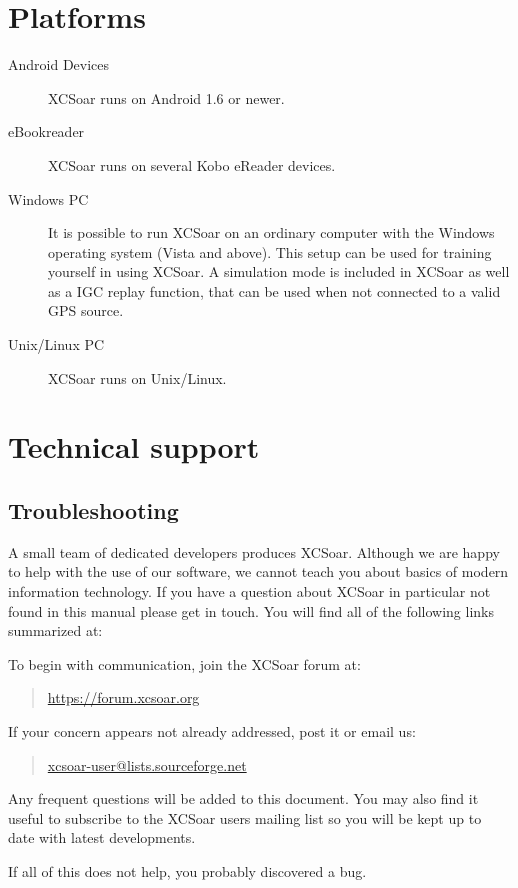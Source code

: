 \section{Platforms}
\begin{description}
\item[Android Devices]
XCSoar runs on Android 1.6 or newer.
\item [eBookreader]
XCSoar runs on several Kobo eReader devices.
\item[Windows PC]
It is possible to run XCSoar on an ordinary computer with the Windows
operating system (Vista and above). This setup can be used for training yourself in using XCSoar.
A simulation mode is included in XCSoar as well as a IGC replay function, that
can be used when not connected to a valid GPS source.
\item[Unix/Linux PC]
XCSoar runs on Unix/Linux.
\end{description}



\section{Technical support}

\subsection*{Troubleshooting}
A small team of dedicated developers produces XCSoar. Although we are
happy to help with the use of our software, we cannot teach you about
basics of modern information technology. If you have a question about XCSoar in
particular not found in this manual please get in touch. You will find all of the following links summarized at:
\begin{quote}
\end{quote}
To begin with communication, join the XCSoar forum at:
\begin{quote}
\url{https://forum.xcsoar.org}
\end{quote}
If your concern appears not already addressed, post it or email us: 
\begin{quote}
\href{mailto:xcsoar-user@lists.sourceforge.net}{xcsoar-user@lists.sourceforge.net}
\end{quote}
Any frequent questions will be added to this document.
You may also find it useful to subscribe to the XCSoar users mailing
list so you will be kept up to date with latest developments.

If all of this does not help, you probably discovered a bug.


